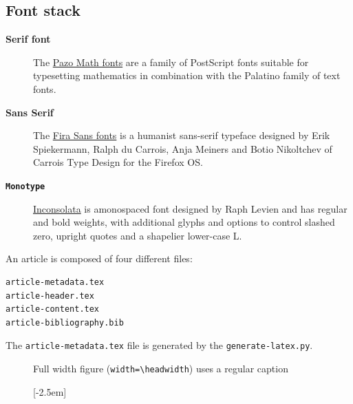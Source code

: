 \documentclass[a4paper,10pt]{article}
\begin{document}
\subsection*{Font stack}
\begin{description}
\item[{\bfseries Serif font}] The
  \href{http://www.tug.dk/FontCatalogue/urwpalladio}{Pazo Math fonts} are a
  family of PostScript fonts suitable for typesetting mathematics in
  combination with the Palatino family of text fonts.
\item[{\sf \bfseries Sans Serif}] The
  \href{http://www.tug.dk/FontCatalogue/firasans/}{Fira Sans fonts} is a
  humanist sans-serif typeface designed by Erik Spiekermann, Ralph du Carrois,
  Anja Meiners and Botio Nikoltchev of Carrois Type Design for the Firefox OS.
\item[{\tt \bfseries Monotype}]
  \href{http://www.tug.dk/FontCatalogue/inconsolata/}{Inconsolata} is
  amonospaced font designed by Raph Levien and has regular and bold weights,
  with additional glyphs and options to control slashed zero, upright quotes
  and a shapelier lower-case L.
\end{description}

An article is composed of four different files:
\begin{lstlisting}
article-metadata.tex
article-header.tex
article-content.tex
article-bibliography.bib
\end{lstlisting}


The {\tt article-metadata.tex} file is generated by the {\tt generate-latex.py}.\\

\begin{minipage}{\headwidth}
  \em \lipsum[1]
\end{minipage}


\begin{figure}[htbp]
  \caption{Full width figure ({\tt width=\textbackslash headwidth}) uses a
    regular caption}
  \label{fig:1}
\end{figure}

\begin{figure}[htbp]
  [-2.5em]
  \label{fig:2}
\end{figure}
\end{document}
